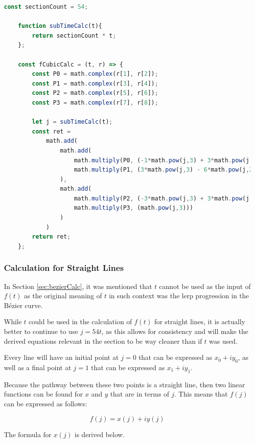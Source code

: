 \documentclass[letterpaper, 12pt]{article}
\begin{document}
\begin{lstlisting}[language=JavaScript]
    const sectionCount = 54;

    function subTimeCalc(t){
        return sectionCount * t;
    };

    const fCubicCalc = (t, r) => {
        const P0 = math.complex(r[1], r[2]);
        const P1 = math.complex(r[3], r[4]);
        const P2 = math.complex(r[5], r[6]);
        const P3 = math.complex(r[7], r[8]);

        let j = subTimeCalc(t);
        const ret = 
            math.add(
                math.add(
                    math.multiply(P0, (-1*math.pow(j,3) + 3*math.pow(j,2) - 3*j + 1)),
                    math.multiply(P1, (3*math.pow(j,3) - 6*math.pow(j,2) + 3*j))
                ),
                math.add(
                    math.multiply(P2, (-3*math.pow(j,3) + 3*math.pow(j,2))),
                    math.multiply(P3, (math.pow(j,3)))
                )
            )
        return ret;
    };
\end{lstlisting}

\subsubsection{Calculation for Straight Lines}

In Section \ref*{sec:bezierCalc}, it was mentioned that \(t\) cannot
be used as the input of \(f(t)\) as the original meaning of \(t\) in
such context was the lerp progression in the Bézier curve.

While \(t\) could be used in the calculation of \(f(t)\) for straight lines,
it is actually better to continue to use \(j = 54t\), as this allows
for consistency and will make the derived equations relevant in the section
to be way cleaner than if \(t\) was used.

Every line will have an initial point at \(j=0\) that can be
expressed as \(x_0 + iy_0\), as well as a final point at \(j=1\)
that can be expressed as \(x_1 + iy_1\).

Because the pathway between these two points is a straight line,
then two linear functions can be found for \(x\) and \(y\) that
are in terms of \(j\). This means that \(f(j)\) can be expressed
as follows:

\begin{equation*}
    f(j) = x(j) + iy(j)
\end{equation*}

The formula for \(x(j)\) is derived below.
\end{document}
